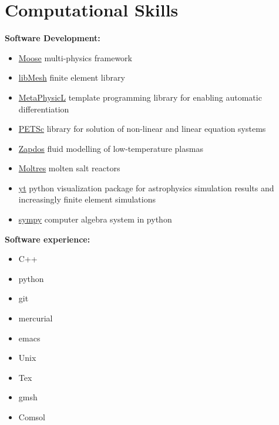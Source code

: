 \documentclass[a4paper,10pt]{article} %
\newcounter{magicrownumbers}
\begin{document}
\setcounter{magicrownumbers}{0}



\FloatBarrier


\section{Computational Skills}

\textbf{Software Development:}
\begin{itemize}
\item \href{https://github.com/idaholab/moose}{Moose} multi-physics framework
\item \href{https://github.com/libmesh/libmesh}{libMesh} finite element library
\item \href{https://github.com/roystgnr/metaphysicl}{MetaPhysicL} template programming library for enabling automatic differentiation
\item \href{https://bitbucket.org/petsc/petsc}{PETSc} library for solution of non-linear and linear equation systems
\item \href{https://github.com/shannon-lab/zapdos}{Zapdos} fluid modelling of low-temperature plasmas
\item \href{https://github.com/arfc/moltres}{Moltres} molten salt reactors
\item \href{https://bitbucket.org/yt/yt\_analysis}{yt} python visualization package for astrophysics simulation results and increasingly finite element simulations
\item \href{https://github.com/sympy/sympy}{sympy} computer algebra system in python
\end{itemize}

\textbf{Software experience:}
\begin{itemize}
\item C++
\item python
\item git
\item mercurial
\item emacs
\item Unix
\item Tex
\item gmsh
\item Comsol
\end{itemize}
\end{document}

